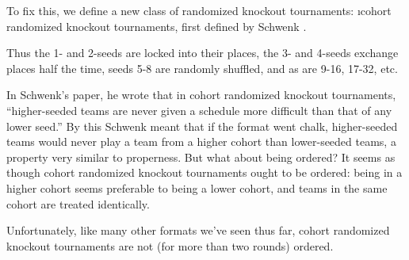 {    
    
    To fix this, we define a new class of randomized knockout tournaments: \i{cohort randomized knockout tournaments}, first defined by Schwenk \cite{randomized_cohort}.
    

    Thus the 1- and 2-seeds are locked into their places, the 3- and 4-seeds exchange places half the time, seeds 5-8 are randomly shuffled, and as are 9-16, 17-32, etc. 
    

    In Schwenk's paper, he wrote that in cohort randomized knockout tournaments, ``higher-seeded teams are never given a schedule more difficult than that of any lower seed.'' By this Schwenk meant that if the format went chalk, higher-seeded teams would never play a team from a higher cohort than lower-seeded teams, a property very similar to properness. But what about being ordered? It seems as though cohort randomized knockout tournaments ought to be ordered: being in a higher cohort seems preferable to being a lower cohort, and teams  in the same cohort are treated identically.

    Unfortunately, like many other formats we've seen thus far, cohort randomized knockout tournaments are not (for more than two rounds) ordered.


}
